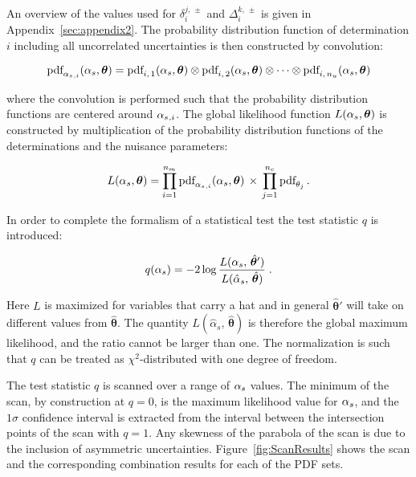 % 
An overview of the values used for $\delta_i^{j,\,\pm}$ and $\Delta_i^{k,\,\pm}$
is given in Appendix~\ref{sec:appendix2}.
% 
The probability distribution function of determination $i$ including
all uncorrelated uncertainties is then constructed by convolution:
% 
\begin{linenomath*}
\begin{equation}
\text{pdf}_{ \alpha_s {}_{,i} }(\alpha_s, \bm{\theta}) =
    \text{pdf}_{i,\,1}(\alpha_s, \bm{\theta}) \otimes \text{pdf}_{i,\,2}(\alpha_s, \bm{\theta})
    \otimes \cdots
    \otimes \text{pdf}_{i,\,n_u}(\alpha_s, \bm{\theta})
\end{equation}
\end{linenomath*}
% 
where the convolution is performed such that the probability distribution
functions are centered around $\alpha_s{}_{,i}$.
% 
% 
The global likelihood function $L( \alpha_s , \bm{\theta} )$ is constructed
by multiplication of the probability distribution functions of the
determinations and the nuisance parameters:
% 
\begin{linenomath*}
\begin{equation}
L( \alpha_s , \bm{\theta} ) = 
    \prod_{i=1}^{n_m} \text{pdf}_{ \alpha_s {}_{,i} }(\alpha_s, \bm{\theta})
    \, \times \,
    \prod_{j=1}^{n_c} \text{pdf}_{\theta_j}
    \,.
    \label{eq:globallikelihoodfunction}
\end{equation}
\end{linenomath*}
% 
In order to complete the formalism of a statistical test the test
statistic $q$ is introduced:
%
\begin{linenomath*}
\begin{equation}
q( \alpha_s ) = -2 \log \frac{ L( \alpha_s ,\, \hat{\bm{\theta}}' ) }{ L( \hat{\alpha}_s ,\, \hat{\bm{\theta}} ) }
\;.
\end{equation}
\end{linenomath*}
% 
Here $L$ is maximized for variables that carry a hat and in general
$\hat{\bm{\theta}}'$ will take on different values from
$\hat{\bm{\theta}}$.
%
The quantity $L( \hat{\alpha}_s ,\, \hat{\bm{\theta}} )$ is therefore
the global maximum likelihood, and the ratio cannot be larger than
one. 
%
The normalization is such
that $q$ can be treated as $\chi^2$-distributed with one degree of
freedom.

The test statistic $q$ is scanned over a range of $\alpha_s$ values. The
minimum of the scan, by construction at $q=0$, is the maximum
likelihood value for $\alpha_s$, and the $1\sigma$ confidence interval is
extracted from the interval between the intersection points of the
scan with $q=1$. Any skewness of the parabola of the scan is due to
the inclusion of asymmetric uncertainties.
Figure~\ref{fig:ScanResults} shows the scan and the corresponding
combination results for each of the PDF sets. 

